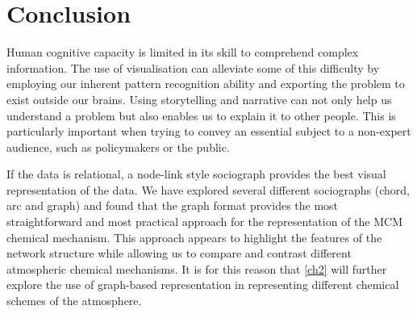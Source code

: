 %
%



\section{Conclusion}

Human cognitive capacity is limited in its skill to comprehend complex information. The use of visualisation can alleviate some of this difficulty by employing our inherent pattern recognition ability and exporting the problem to exist outside our brains. Using storytelling and narrative can not only help us understand a problem but also enables us to explain it to other people. This is particularly important when trying to convey an essential subject to a non-expert audience, such as policymakers or the public.

If the data is relational, a node-link style sociograph provides the best visual representation of the data. We have explored several different sociographs (chord, arc and graph) and found that the graph format provides the most straightforward and most practical approach for the representation of the MCM chemical mechanism. This approach appears to highlight the features of the network structure while allowing us to compare and contrast different atmospheric chemical mechanisms. It is for this reason that \autoref{ch2} will further explore the use of graph-based representation in representing different chemical schemes of the atmosphere.

